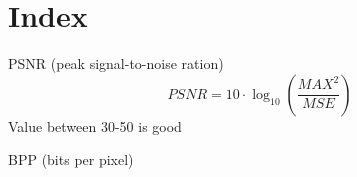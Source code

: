 \chapter{Index}

PSNR (peak signal-to-noise ration)
\[
PSNR = 10 \cdot \log_{10} \left( \frac{ MAX^{2} }{ MSE } \right)
\] 
Value between 30-50 is good \cite{}


BPP (bits per pixel)

